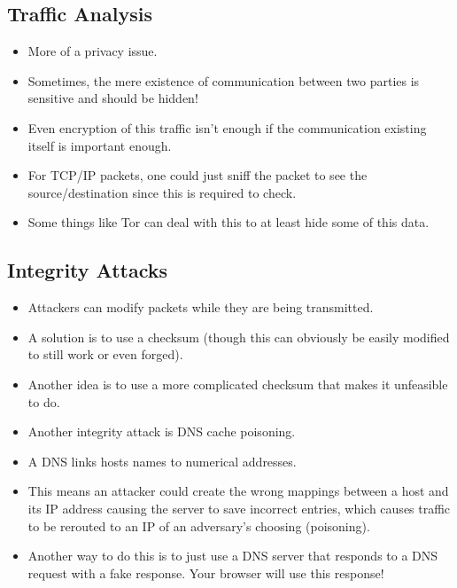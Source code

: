 \documentclass{article}
\begin{document}
\subsection{Traffic Analysis}
\begin{itemize}
    \item More of a privacy issue.
    \item Sometimes, the mere existence of communication between two parties is sensitive and should be hidden!
    \item Even encryption of this traffic isn't enough if the communication existing itself is important enough.
    \item For TCP/IP packets, one could just sniff the packet to see the source/destination since this is required to check.
    \item Some things like Tor can deal with this to at least hide some of this data.
\end{itemize}

\subsection{Integrity Attacks}
\begin{itemize}
    \item Attackers can modify packets while they are being transmitted.
    \item A solution is to use a checksum (though this can obviously be easily modified to still work or even forged).
    \item Another idea is to use a more complicated checksum that makes it unfeasible to do.
    \item Another integrity attack is DNS cache poisoning.
    \item A DNS links hosts names to numerical addresses.
    \item This means an attacker could create the wrong mappings between a host and its IP address causing the server to save incorrect entries, which causes traffic to be rerouted to an IP of an adversary's choosing (poisoning).
    \item Another way to do this is to just use a DNS server that responds to a DNS request with a fake response.  Your browser will use this response!
\end{itemize}
\end{document}
